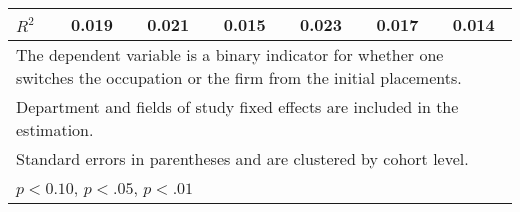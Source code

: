 \begin{table}[htbp]
\begin{adjustbox}{max width=1\textwidth}
\begin{tabular}{l*{6}{c}}
\(R^{2}\)   &       0.019         &       0.021         &       0.015         &       0.023         &       0.017         &       0.014         \\
\hline\hline
\multicolumn{7}{l}{\footnotesize The dependent variable is a binary indicator for whether one switches the occupation or the firm from 	the initial placements.}\\
\multicolumn{7}{l}{\footnotesize Department and fields of study fixed effects are included in the estimation.}\\
\multicolumn{7}{l}{\footnotesize Standard errors in parentheses and are clustered by cohort level.}\\
\multicolumn{7}{l}{\footnotesize \sym{*} \(p<0.10\), \sym{**} \(p<.05\), \sym{***} \(p<.01\)}\\
\end{tabular}%
\end{adjustbox}
\end{table}